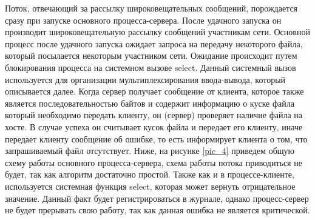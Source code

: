 Поток, отвечающий за рассылку широковещательных сообщений,
порождается сразу при запуске основного процесса-сервера. После удачного
запуска он производит широковещательную рассылку сообщений участникам
сети.
\newpar
Основной процесс после удачного запуска ожидает запроса на передачу
некоторого файла, который посылается некоторым участником сети.
Ожидание происходит путем блокирования процесса на системном вызове
select. Данный системный вызов используется для организации
мультиплексирования ввода-вывода, который описывается далее. Когда
сервер получает сообщение от клиента, которое также является
последовательностью байтов и содержит информацию о куске файла который
необходимо передать клиенту, он (сервер) проверяет наличие файла на хосте.
В случае успеха он считывает кусок файла и передает его клиенту, иначе
передает клиенту сообщение об ошибке, то есть информирует клиента о том,
что запрашиваемый файл отсутствует.
\newpar
Ниже, на рисунке \ref{pic_4} приведем общую схему работы основного процесса-сервера,
схема работы потока приводиться не будет, так как алгоритм
достаточно простой. Также как и в процессе-клиенте, используется системная
функция select, которая может вернуть отрицательное значение. Данный факт
будет регистрироваться в журнале, однако процесс-сервер не будет прерывать
свою работу, так как данная ошибка не является критической.

